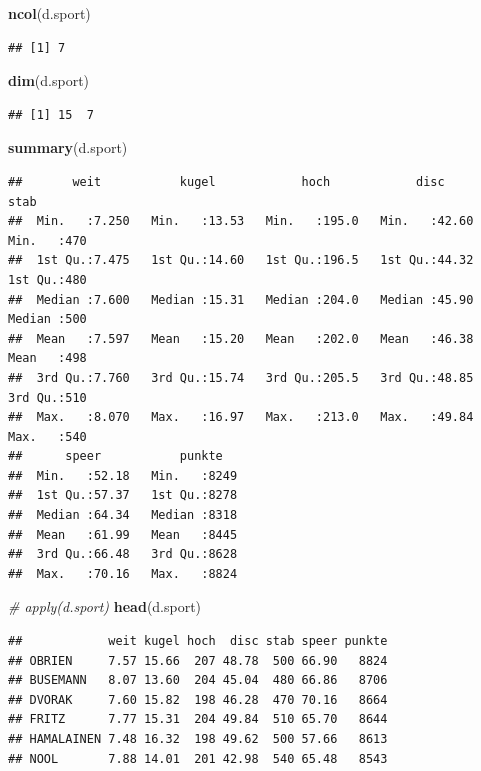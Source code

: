\documentclass[
]{article}
\newenvironment{Shaded}{\begin{snugshade}}{\end{snugshade}}
\newcommand{\CommentTok}[1]{\textcolor[rgb]{0.56,0.35,0.01}{\textit{#1}}}
\newcommand{\FunctionTok}[1]{\textcolor[rgb]{0.13,0.29,0.53}{\textbf{#1}}}
\newcommand{\NormalTok}[1]{#1}
\begin{document}
\begin{Shaded}
\begin{Highlighting}[]
\FunctionTok{ncol}\NormalTok{(d.sport)}
\end{Highlighting}
\end{Shaded}

\begin{verbatim}
## [1] 7
\end{verbatim}

\begin{Shaded}
\begin{Highlighting}[]
\FunctionTok{dim}\NormalTok{(d.sport)}
\end{Highlighting}
\end{Shaded}

\begin{verbatim}
## [1] 15  7
\end{verbatim}

\begin{Shaded}
\begin{Highlighting}[]
\FunctionTok{summary}\NormalTok{(d.sport)}
\end{Highlighting}
\end{Shaded}

\begin{verbatim}
##       weit           kugel            hoch            disc            stab    
##  Min.   :7.250   Min.   :13.53   Min.   :195.0   Min.   :42.60   Min.   :470  
##  1st Qu.:7.475   1st Qu.:14.60   1st Qu.:196.5   1st Qu.:44.32   1st Qu.:480  
##  Median :7.600   Median :15.31   Median :204.0   Median :45.90   Median :500  
##  Mean   :7.597   Mean   :15.20   Mean   :202.0   Mean   :46.38   Mean   :498  
##  3rd Qu.:7.760   3rd Qu.:15.74   3rd Qu.:205.5   3rd Qu.:48.85   3rd Qu.:510  
##  Max.   :8.070   Max.   :16.97   Max.   :213.0   Max.   :49.84   Max.   :540  
##      speer           punkte    
##  Min.   :52.18   Min.   :8249  
##  1st Qu.:57.37   1st Qu.:8278  
##  Median :64.34   Median :8318  
##  Mean   :61.99   Mean   :8445  
##  3rd Qu.:66.48   3rd Qu.:8628  
##  Max.   :70.16   Max.   :8824
\end{verbatim}

\begin{Shaded}
\begin{Highlighting}[]
\CommentTok{\# apply(d.sport)}
\FunctionTok{head}\NormalTok{(d.sport)}
\end{Highlighting}
\end{Shaded}

\begin{verbatim}
##            weit kugel hoch  disc stab speer punkte
## OBRIEN     7.57 15.66  207 48.78  500 66.90   8824
## BUSEMANN   8.07 13.60  204 45.04  480 66.86   8706
## DVORAK     7.60 15.82  198 46.28  470 70.16   8664
## FRITZ      7.77 15.31  204 49.84  510 65.70   8644
## HAMALAINEN 7.48 16.32  198 49.62  500 57.66   8613
## NOOL       7.88 14.01  201 42.98  540 65.48   8543
\end{verbatim}
\end{document}
